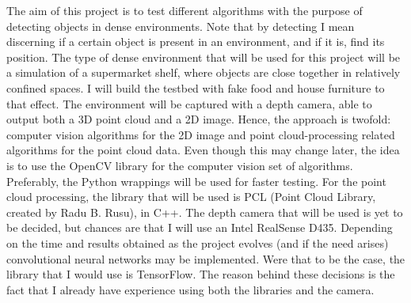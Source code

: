 \documentclass[../main.tex]{subfiles}
\begin{document}
The aim of this project is to test different algorithms with the purpose of detecting objects in dense environments. Note that by detecting I mean discerning if a certain object is present in an environment, and if it is, find its position. The type of dense environment that will be used for this project will be a simulation of a supermarket shelf, where objects are close together in relatively confined spaces. I will build the testbed with fake food and house furniture to that effect. The environment will be captured with a depth camera, able to output both a 3D point cloud and a 2D image. Hence, the approach is twofold: computer vision algorithms for the 2D image and point cloud-processing related algorithms for the point cloud data.
Even though this may change later, the idea is to use the OpenCV library for the computer vision set of algorithms. Preferably, the Python wrappings will be used for faster testing. For the point cloud processing, the library that will be used is PCL (Point Cloud Library, created by Radu B. Rusu), in C++. The depth camera that will be used is yet to be decided, but chances are that I will use an Intel RealSense D435. Depending on the time and results obtained as the project evolves (and if the need arises) convolutional neural networks may be implemented. Were that to be the case, the library that I would use is TensorFlow. The reason behind these decisions is the fact that I already have experience using both the libraries and the camera. 
 
\end{document}
